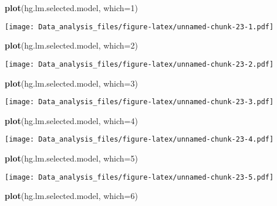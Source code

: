 \documentclass[12pt,]{article}
\newenvironment{Shaded}{\begin{snugshade}}{\end{snugshade}}
\newcommand{\KeywordTok}[1]{\textcolor[rgb]{0.13,0.29,0.53}{\textbf{#1}}}
\newcommand{\DataTypeTok}[1]{\textcolor[rgb]{0.13,0.29,0.53}{#1}}
\newcommand{\DecValTok}[1]{\textcolor[rgb]{0.00,0.00,0.81}{#1}}
\newcommand{\NormalTok}[1]{#1}
\begin{document}
\begin{Shaded}
\begin{Highlighting}[]
\KeywordTok{plot}\NormalTok{(hg.lm.selected.model, }\DataTypeTok{which=}\DecValTok{1}\NormalTok{)}
\end{Highlighting}
\end{Shaded}

\texttt{[image: Data\_analysis\_files/figure-latex/unnamed-chunk-23-1.pdf]}

\begin{Shaded}
\begin{Highlighting}[]
\KeywordTok{plot}\NormalTok{(hg.lm.selected.model, }\DataTypeTok{which=}\DecValTok{2}\NormalTok{)}
\end{Highlighting}
\end{Shaded}

\texttt{[image: Data\_analysis\_files/figure-latex/unnamed-chunk-23-2.pdf]}

\begin{Shaded}
\begin{Highlighting}[]
\KeywordTok{plot}\NormalTok{(hg.lm.selected.model, }\DataTypeTok{which=}\DecValTok{3}\NormalTok{)}
\end{Highlighting}
\end{Shaded}

\texttt{[image: Data\_analysis\_files/figure-latex/unnamed-chunk-23-3.pdf]}

\begin{Shaded}
\begin{Highlighting}[]
\KeywordTok{plot}\NormalTok{(hg.lm.selected.model, }\DataTypeTok{which=}\DecValTok{4}\NormalTok{)}
\end{Highlighting}
\end{Shaded}

\texttt{[image: Data\_analysis\_files/figure-latex/unnamed-chunk-23-4.pdf]}

\begin{Shaded}
\begin{Highlighting}[]
\KeywordTok{plot}\NormalTok{(hg.lm.selected.model, }\DataTypeTok{which=}\DecValTok{5}\NormalTok{)}
\end{Highlighting}
\end{Shaded}

\texttt{[image: Data\_analysis\_files/figure-latex/unnamed-chunk-23-5.pdf]}

\begin{Shaded}
\begin{Highlighting}[]
\KeywordTok{plot}\NormalTok{(hg.lm.selected.model, }\DataTypeTok{which=}\DecValTok{6}\NormalTok{)}
\end{Highlighting}
\end{Shaded}
\end{document}

